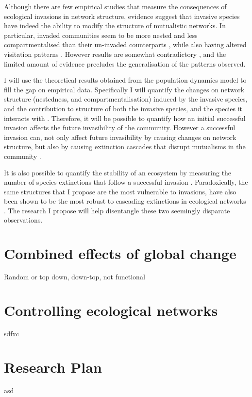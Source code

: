 \documentclass[a4paper]{article}
\begin{document}
Although there are few empirical studies that measure the consequences of ecological invasions in network structure, evidence suggest that invasive species have indeed the ability to modify the structure of mutualistic networks.
In particular, invaded communities seem to be more nested \citep{Bartomeus2008, Stouffer2014} and less compartmentalised \citep{Albrecht2014} than their un-invaded counterparts , while also having altered visitation patterns \citep{Vila2009}.
However results are somewhat contradictory \citep{Gilberto2012}, and the limited amount of evidence precludes the generalisation of the patterns observed.

I will use the theoretical results obtained from the population dynamics model to fill the gap on empirical data.
Specifically I will quantify the changes on network structure (nestedness, and compartmentalisation) induced by the invasive species, and the contribution to structure of both the invasive species, and the species it interacts with \citep{Saavedra2011, Stouffer2014}.
Therefore, it will be possible to quantify how an initial successful invasion affects the future invasibility of the community.
However a successful invasion can, not only affect future invasibility by causing changes on network structure, but also by causing extinction cascades that disrupt mutualisms in the community \citep{Christian2001, RodriguezCabal2013}.

It is also possible to quantify the stability of an ecosystem by measuring the number of species extinctions that follow a successful invasion \citep{Post1983, Ives2007}.
Paradoxically, the same structures that I propose are the most vulnerable to invasions, have also been shown to be the most robust to cascading extinctions in ecological networks \citep{Tylianakis2010, Stouffer2011, Albrecht2014}.
The research I propose will help disentangle these two seemingly disparate observations.

\chapter*{Combined effects of global change}

Random or top down, down-top, not functional

\chapter*{Controlling ecological networks}

sdfxc

\chapter*{Research Plan}

asd

\footnotesize
\twocolumn

\end{document}
